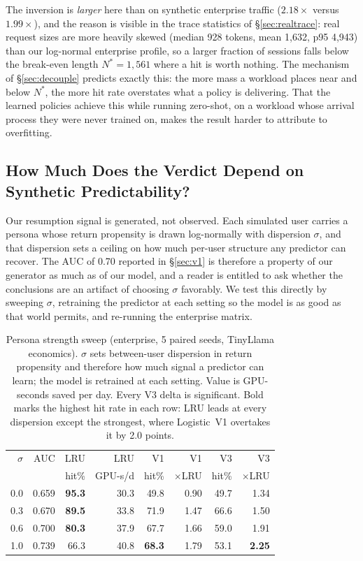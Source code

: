 \documentclass[letterpaper,twocolumn,10pt]{article}
\begin{document}
The inversion is \emph{larger} here than on synthetic enterprise traffic ($2.18\times$ versus $1.99\times$), and the reason is visible in the trace statistics of \S\ref{sec:realtrace}: real request sizes are more heavily skewed (median 928 tokens, mean 1{,}632, p95 4{,}943) than our log-normal enterprise profile, so a larger fraction of sessions falls below the break-even length $N^{*}{=}1{,}561$ where a hit is worth nothing. The mechanism of \S\ref{sec:decouple} predicts exactly this: the more mass a workload places near and below $N^{*}$, the more hit rate overstates what a policy is delivering. That the learned policies achieve this while running zero-shot, on a workload whose arrival process they were never trained on, makes the result harder to attribute to overfitting.

\subsection{How Much Does the Verdict Depend on Synthetic Predictability?}
\label{sec:persona}

Our resumption signal is generated, not observed. Each simulated user carries a
persona whose return propensity is drawn log-normally with dispersion $\sigma$, and
that dispersion sets a ceiling on how much per-user structure any predictor can
recover. The AUC of 0.70 reported in \S\ref{sec:v1} is therefore a property of our
generator as much as of our model, and a reader is entitled to ask whether the
conclusions are an artifact of choosing $\sigma$ favorably. We test this directly by
sweeping $\sigma$, retraining the predictor at each setting so the model is as good as
that world permits, and re-running the enterprise matrix.

\begin{table}[t]
\centering
\caption{Persona strength sweep (enterprise, 5 paired seeds, TinyLlama economics).
$\sigma$ sets between-user dispersion in return propensity and therefore how much
signal a predictor can learn; the model is retrained at each setting. Value is
GPU-seconds saved per day. Every V3 delta is significant. Bold marks the highest hit rate in each row: LRU leads at every dispersion except the strongest, where Logistic~V1 overtakes it by 2.0 points.}
\label{tab:persona}
\footnotesize
\setlength{\tabcolsep}{2pt}
\begin{tabular}{@{}rrrrrrrr@{}}
\toprule
$\sigma$ & AUC & LRU & LRU & V1 & V1 & V3 & V3 \\
 &  & hit\% & GPU-s/d & hit\% & $\times$LRU & hit\% & $\times$LRU \\
\midrule
0.0 & 0.659 & \textbf{95.3} & 30.3 & 49.8 & 0.90 & 49.7 & 1.34 \\
0.3 & 0.670 & \textbf{89.5} & 33.8 & 71.9 & 1.47 & 66.6 & 1.50 \\
0.6 & 0.700 & \textbf{80.3} & 37.9 & 67.7 & 1.66 & 59.0 & 1.91 \\
1.0 & 0.739 & 66.3 & 40.8 & \textbf{68.3} & 1.79 & 53.1 & \textbf{2.25} \\
\bottomrule
\end{tabular}
\end{table}
\end{document}

